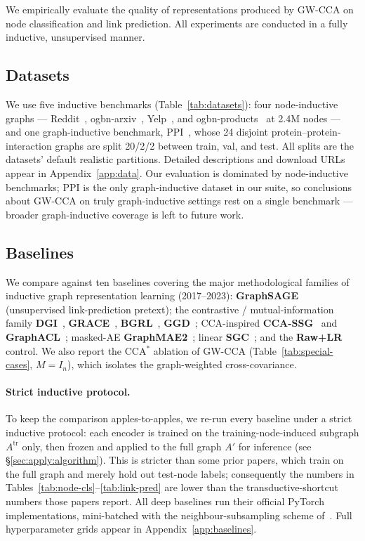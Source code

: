\documentclass{article}
\begin{document}
We empirically evaluate the quality of representations produced by GW-CCA on
node classification and link prediction. All experiments are conducted in a
fully inductive, unsupervised manner.

\subsection{Datasets}
We use five inductive benchmarks (Table~\ref{tab:datasets}): four
node-inductive graphs --- Reddit~\citep{hamilton2017inductive},
ogbn-arxiv~\citep{hu2020open}, Yelp~\citep{zeng2019graphsaint}, and
ogbn-products~\citep{hu2020open} at 2.4M nodes --- and one graph-inductive
benchmark, PPI~\citep{hamilton2017inductive}, whose 24 disjoint
protein--protein-interaction graphs are split 20/2/2 between train, val, and
test. All splits are the datasets' default realistic partitions. Detailed
descriptions and download URLs appear in Appendix~\ref{app:data}.
Our evaluation is dominated by node-inductive benchmarks;
PPI is the only graph-inductive dataset in our suite, so conclusions about
GW-CCA on truly graph-inductive settings rest on a single benchmark ---
broader graph-inductive coverage is left to future work.

\subsection{Baselines}
\label{sec:exp:baselines}
We compare against ten baselines covering the major methodological
families of inductive graph representation learning (2017--2023):
\textbf{GraphSAGE}~\citep{hamilton2017inductive} (unsupervised
link-prediction pretext); the contrastive / mutual-information family
\textbf{DGI}~\citep{velickovic2019deep},
\textbf{GRACE}~\citep{zhu2020deep},
\textbf{BGRL}~\citep{thakoor2022bgrl},
\textbf{GGD}~\citep{zheng2022ggd}; CCA-inspired
\textbf{CCA-SSG}~\citep{zhang2021ccassg} and
\textbf{GraphACL}~\citep{xiao2023graphacl}; masked-AE
\textbf{GraphMAE2}~\citep{hou2023graphmae2}; linear
\textbf{SGC}~\citep{wu2019simplifying}; and the \textbf{Raw+LR} control.
We also report the CCA$^\ast$ ablation of GW-CCA
(Table~\ref{tab:special-cases}, $M = I_n$), which isolates the
graph-weighted cross-covariance.

\paragraph{Strict inductive protocol.}
To keep the comparison apples-to-apples, we re-run every baseline under a
strict inductive protocol: each encoder is trained on the
training-node-induced subgraph $A^{\text{tr}}$ only, then frozen and applied
to the full graph $A'$ for inference (see \S\ref{sec:apply:algorithm}).
This is stricter than some prior papers, which train on the full graph and
merely hold out test-node labels; consequently the numbers in
Tables~\ref{tab:node-cls}--\ref{tab:link-pred} are lower than the
transductive-shortcut numbers those papers report. All deep baselines run
their official PyTorch implementations, mini-batched with the
neighbour-subsampling scheme of~\citet{hamilton2017inductive}. Full
hyperparameter grids appear in Appendix~\ref{app:baselines}.
\end{document}
